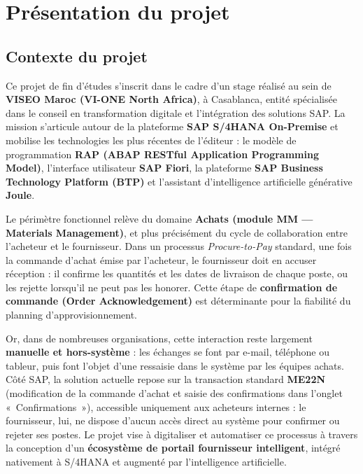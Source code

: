 \documentclass[12pt,a4paper,oneside]{report}
\begin{document}
\clearpage
\section{Présentation du projet}\label{ch1:presentation-projet}

\subsection{Contexte du projet}\label{ch1:contexte-projet}

Ce projet de fin d'études s'inscrit dans le cadre d'un stage réalisé au sein de
\textbf{VISEO Maroc (VI-ONE North Africa)}, à Casablanca, entité spécialisée dans
le conseil en transformation digitale et l'intégration des solutions SAP. La mission
s'articule autour de la plateforme \textbf{SAP S/4HANA On-Premise} et mobilise les
technologies les plus récentes de l'éditeur : le modèle de programmation
\textbf{RAP (ABAP RESTful Application Programming Model)}, l'interface utilisateur
\textbf{SAP Fiori}, la plateforme \textbf{SAP Business Technology Platform (BTP)} et
l'assistant d'intelligence artificielle générative \textbf{Joule}.

Le périmètre fonctionnel relève du domaine \textbf{Achats (module MM --- Materials
Management)}, et plus précisément du cycle de collaboration entre l'acheteur et le
fournisseur. Dans un processus \textit{Procure-to-Pay} standard, une fois la commande
d'achat émise par l'acheteur, le fournisseur doit en accuser réception : il confirme
les quantités et les dates de livraison de chaque poste, ou les rejette lorsqu'il ne
peut pas les honorer. Cette étape de \textbf{confirmation de commande (Order
Acknowledgement)} est déterminante pour la fiabilité du planning d'approvisionnement.

Or, dans de nombreuses organisations, cette interaction reste largement
\textbf{manuelle et hors-système} : les échanges se font par e-mail, téléphone ou
tableur, puis font l'objet d'une ressaisie dans le système par les équipes achats.
Côté SAP, la solution actuelle repose sur la transaction standard \textbf{ME22N}
(modification de la commande d'achat et saisie des confirmations dans l'onglet
«~Confirmations~»), accessible uniquement aux acheteurs internes : le fournisseur,
lui, ne dispose d'aucun accès direct au système pour confirmer ou rejeter ses postes. Le projet vise à digitaliser
et automatiser ce processus à travers la conception d'un \textbf{écosystème de portail
fournisseur intelligent}, intégré nativement à S/4HANA et augmenté par l'intelligence
artificielle.
\end{document}
